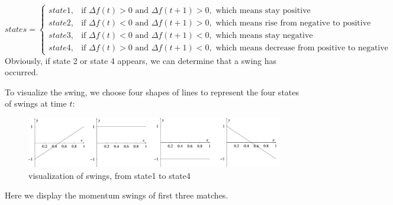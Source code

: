 $$states=\begin{cases}
    state1, &\text{if } \Delta f(t)>0 \text{ and } \Delta f(t+1)>0, \text{ which means stay positive}\\
    state2, &\text{if } \Delta f(t)<0 \text{ and } \Delta f(t+1)>0, \text{ which means rise from negative to positive}\\
    state3, &\text{if } \Delta f(t)<0 \text{ and } \Delta f(t+1)<0, \text{ which means stay negative}\\
    state4, &\text{if } \Delta f(t)>0 \text{ and } \Delta f(t+1)<0, \text{ which means decrease from positive to negative}
\end{cases}$$
Obviously, if state 2 or state 4 appears, we can determine that a swing has occurred. 

To visualize the swing, we choose four shapes of lines to represent the four states of swings at time $t$:

\begin{figure}[H]
    \centering
        \includegraphics[width=\linewidth]{mainmatter/imgs/states.jpg}
    \caption{visualization of swings, from state1 to state4}
    \label{fig:states}
\end{figure}

Here we display the momentum swings of first three matches.

